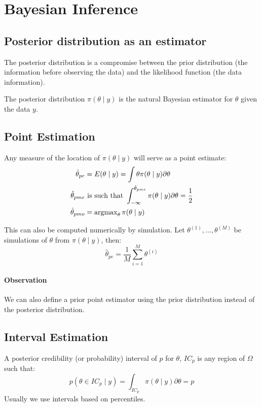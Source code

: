 
\section{Bayesian Inference}

\subsection{Posterior distribution as an estimator}

The posterior distribution is a compromise between the prior
distribution (the information before observing the data) and the
likelihood function (the data information).

The posterior distribution $\pi(\theta \mid y)$ is the natural
Bayesian estimator for $\theta$ given the data $y$.

\subsection{Point Estimation}
Any measure of the location of $\pi(\theta \mid y)$ will serve as a point
estimate:
\begin{align*}
    \hat{\theta}_{pe} &= E(\theta \mid y) = \int \theta \pi(\theta \mid y) \partial\theta \\
    \hat{\theta}_{pme} &\text{ is such that } \int_{-\infty}^{\hat{\theta}_{pme}} \pi(\theta \mid y) \partial\theta = \frac{1}{2} \\
    \hat{\theta}_{pmo} &= \operatorname{argmax}_{\theta} \pi(\theta \mid y) \\
\end{align*}

This can also be computed numerically by simulation. Let $\theta^{(1)}, \dots , \theta^{(M)}$ be
simulations of $\theta$ from $\pi(\theta \mid y)$, then:
\begin{equation}
    \hat{\theta}_{pe} = \frac{1}{M} \sum_{i=1}^M \theta^{(i)}
\end{equation}

\paragraph{Observation} We can also define a prior point estimator using the prior distribution
instead of the posterior distribution.

\subsection{Interval Estimation}
A posterior credibility (or probability) interval of $p$ for $\theta$, $IC_p$ is
any region of $\Omega$ such that:
\begin{equation}
    p(\theta \in IC_p \mid y) = \int_{IC_p} \pi(\theta \mid y) \partial\theta = p
\end{equation}
Usually we use intervals based on percentiles.

